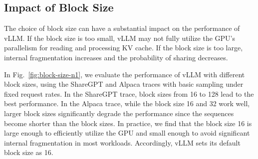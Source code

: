 \documentclass[sigplan,10pt]{acmart}
\newcommand{\sys}[0]{vLLM\xspace}
\begin{document}
\subsection{Impact of Block Size}
\label{sec:eval:blocksize}

The choice of block size can have a substantial impact on the performance of \sys.
If the block size is too small, \sys may not fully utilize the GPU's parallelism for reading and processing KV cache.
If the block size is too large, internal fragmentation increases and the probability of sharing decreases.

In Fig.~\ref{fig:block-size-n1}, we evaluate the performance of \sys with different block sizes, using the ShareGPT and Alpaca traces with basic sampling under fixed request rates.
In the ShareGPT trace, block sizes from 16 to 128 lead to the best performance.
In the Alpaca trace, while the block size 16 and 32 work well, larger block sizes significantly degrade the performance since the sequences become shorter than the block sizes.
In practice, we find that the block size 16 is large enough to efficiently utilize the GPU and small enough to avoid significant internal fragmentation in most workloads.
Accordingly, \sys sets its default block size as 16.
\end{document}
